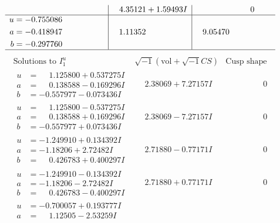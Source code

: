 \documentclass[1p]{elsarticle_modified}
\theoremstyle{definition}
\newcommand{\I}{\sqrt{-1}}
\begin{document}
$$\begin{array}{c|c|c}
 & \phantom{-}4.35121 + 1.59493 I & \phantom{-0.000000 } 0 \\ \hline\begin{aligned}
u &= -0.755086\phantom{ +0.000000I} \\
a &= -0.418947\phantom{ +0.000000I} \\
b &= -0.297760\phantom{ +0.000000I}\end{aligned}
 & \phantom{-}1.11352\phantom{ +0.000000I} & \phantom{-}9.05470\phantom{ +0.000000I}\\
 \hline 
 \end{array}$$\newpage$$\begin{array}{c|c|c}  
\text{Solutions to }I^u_{1}& \I (\text{vol} + \sqrt{-1}CS) & \text{Cusp shape}\\
 \hline 
\begin{aligned}
u &= \phantom{-}1.125800 + 0.537275 I \\
a &= \phantom{-}0.138588 - 0.169296 I \\
b &= -0.557977 - 0.073436 I\end{aligned}
 & \phantom{-}2.38069 + 7.27157 I & \phantom{-0.000000 } 0 \\ \hline\begin{aligned}
u &= \phantom{-}1.125800 - 0.537275 I \\
a &= \phantom{-}0.138588 + 0.169296 I \\
b &= -0.557977 + 0.073436 I\end{aligned}
 & \phantom{-}2.38069 - 7.27157 I & \phantom{-0.000000 } 0 \\ \hline\begin{aligned}
u &= -1.249910 + 0.134392 I \\
a &= -1.18206 + 2.72482 I \\
b &= \phantom{-}0.426783 + 0.400297 I\end{aligned}
 & \phantom{-}2.71880 - 0.77171 I & \phantom{-0.000000 } 0 \\ \hline\begin{aligned}
u &= -1.249910 - 0.134392 I \\
a &= -1.18206 - 2.72482 I \\
b &= \phantom{-}0.426783 - 0.400297 I\end{aligned}
 & \phantom{-}2.71880 + 0.77171 I & \phantom{-0.000000 } 0 \\ \hline\begin{aligned}
u &= -0.700057 + 0.193777 I \\
a &= \phantom{-}1.12505 - 2.53259 I \\

\end{aligned}
\end{array}$$
\end{document}

